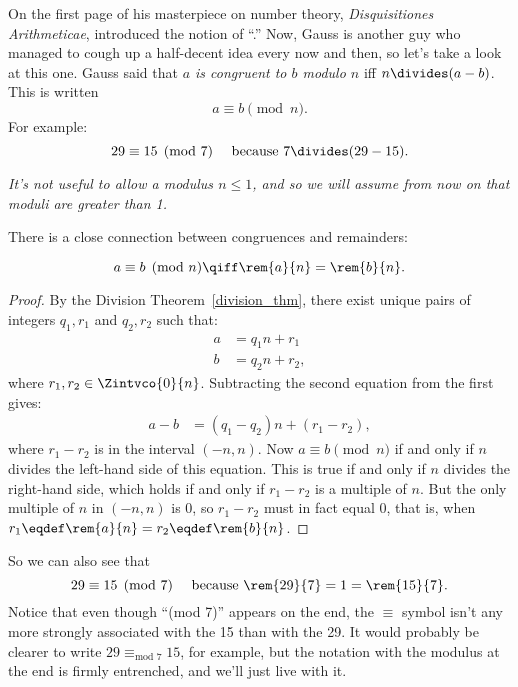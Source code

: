 On the first page of his masterpiece on number theory,
\emph{Disquisitiones Arithmeticae},  introduced the notion
of ``.''  Now, 
Gauss is another guy who managed to
cough up a half-decent idea every now and then, so let's take a look
at this one.  Gauss said that \emph{$a$ is congruent to $b$
  modulo $n$} iff $n \divides (a - b)$.
This is written
\[
a \equiv b \pmod{n}.
\]
For example:
\[
29 \equiv 15 \pmod{7} \quad\text{ because } 7 \divides (29 - 15).
\]

\emph{It's not useful to allow a modulus $n \leq 1$, and so we will
  assume from now on that moduli are greater than 1.}

There is a close connection between congruences and remainders:
\begin{lemma}[Remainder]\label{lem:conrem}
\[
a \equiv b \pmod{n} \qiff \rem{a}{n} = \rem{b}{n}.
\]
\end{lemma}

\begin{proof}
By the Division Theorem~\ref{division_thm}, there exist unique pairs
of integers $q_1, r_1$ and $q_2, r_2$ such that:
\begin{align*}
a & = q_1 n + r_1\\
b & = q_2 n + r_2,
\end{align*}
where $r_1,r_2 \in \Zintvco{0}{n}$.  Subtracting the second equation from the
  first gives:
\begin{align*}
a - b & = (q_1 - q_2) n + (r_1 - r_2),
\end{align*}
where $r_1 - r_2$ is in the interval $(-n,n)$.  Now $a \equiv b
\pmod{n}$ if and only if $n$ divides the left-hand side of this equation.
This is true if and only if $n$ divides the right-hand side, which holds if
and only if $r_1 - r_2$ is a multiple of $n$.  But the only multiple
of $n$ in $(-n,n)$ is 0, so $r_1 - r_2$ must in fact equal 0, that is,
when $r_1 \eqdef \rem{a}{n} = r_2 \eqdef \rem{b}{n}$.
\end{proof}

So we can also see that
\[
29 \equiv 15 \pmod{7} \quad\text{ because } \rem{29}{7} = 1 =
\rem{15}{7}.
\]
Notice that even though ``(mod 7)'' appears on the end, the $\equiv$
symbol isn't any more strongly associated with the 15 than with the
29.  It would probably be clearer to write $29 \equiv_{\text{mod } 7}
15$, for example, but the notation with the modulus at the end is
firmly entrenched, and we'll just live with it.


